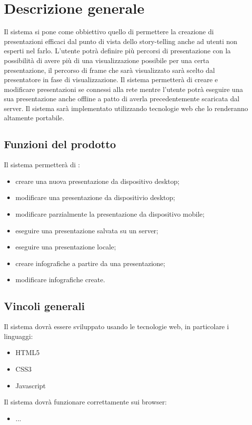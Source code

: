 \section{Descrizione generale}{
Il sistema si pone come obbiettivo quello di permettere la creazione di presentazioni efficaci dal punto di vista dello story-telling anche ad utenti non esperti nel farlo.
L'utente potrà definire più percorsi di presentazione con la possibilità di avere più di una visualizzazione possibile per una certa presentazione, il percorso di frame che sarà visualizzato sarà scelto dal presentatore in fase di visualizzazione.
Il sistema permetterà di creare e modificare presentazioni se connessi alla rete mentre l'utente potrà eseguire una sua presentazione anche offline a patto di averla precedentemente scaricata dal server.
Il sistema sarà implementato utilizzando tecnologie web che lo renderanno altamente portabile.

\subsection{Funzioni del prodotto}{
	Il sistema permetterà di :
	\begin{itemize}
		\item creare una nuova presentazione da dispositivo desktop;
		\item modificare una presentazione da dispositivio desktop;
		\item modificare parzialmente la presentazione da dispositivo mobile;
		\item eseguire una presentazione salvata su un server;
		\item eseguire una presentazione locale;
		\item creare infografiche a partire da una presentazione;
		\item modificare infografiche create.
	\end{itemize}
}
\subsection{Vincoli generali}{
	Il sistema dovrà essere sviluppato usando le tecnologie web, in particolare i linguaggi:
	\begin{itemize}
		\item HTML5
		\item CSS3
		\item Javascript
	\end{itemize}
	
	\noindent
	Il sistema dovrà funzionare correttamente sui browser:
	\begin{itemize}
	\item ...
	\end{itemize}
	}
}